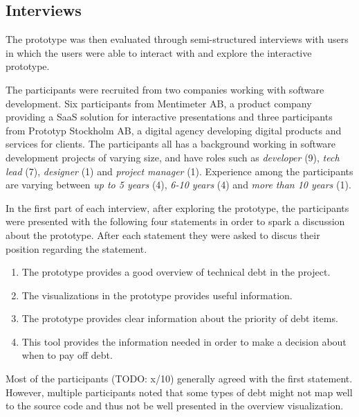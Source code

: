 \subsection{Interviews}

The prototype was then evaluated through semi-structured interviews with users in which the users were able to interact with and explore the interactive prototype.

The participants were recruited from two companies working with software development.
Six participants from Mentimeter AB, a product company providing a SaaS solution for interactive presentations and three participants from Prototyp Stockholm AB, a digital agency developing digital products and services for clients.
The participants all has a background working in software development projects of varying size, and have roles such as \textit{developer} (9), \textit{tech lead} (7), \textit{designer} (1) and \textit{project manager} (1).
Experience among the participants are varying between \textit{up to 5 years} (4), \textit{6-10 years} (4) and \textit{more than 10 years} (1).

In the first part of each interview, after exploring the prototype, the participants were presented with the following four statements in order to spark a discussion about the prototype.
After each statement they were asked to discus their position regarding the statement.

\smallskip
\begin{enumerate}
  \item The prototype provides a good overview of technical debt in the project.
  \item The visualizations in the prototype provides useful information.
  \item The prototype provides clear information about the priority of debt items.
  \item This tool provides the information needed in order to make a decision about when to pay off debt.
\end{enumerate}
\smallskip

Most of the participants (TODO: x/10) generally agreed with the first statement.
However, multiple participants noted that some types of debt might not map well to the source code and thus not be well presented in the overview visualization.

